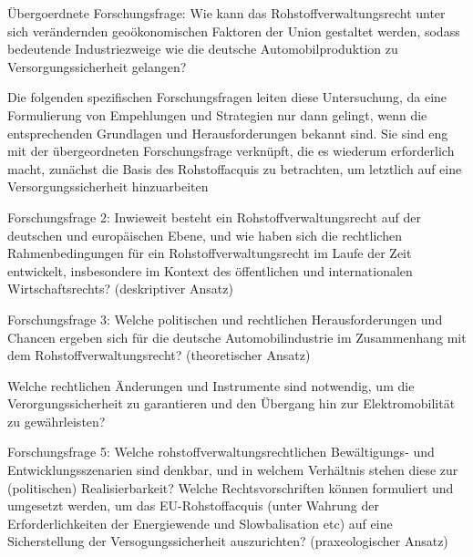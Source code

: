 \documentclass[12pt,a4paper,oneside]{book} %
\begin{document}
Übergoerdnete Forschungsfrage: Wie kann das Rohstoffverwaltungsrecht unter sich verändernden geoökonomischen Faktoren der Union gestaltet werden, sodass bedeutende Industriezweige wie die deutsche Automobilproduktion zu Versorgungssicherheit gelangen?

Die folgenden spezifischen Forschungsfragen leiten diese Untersuchung, da eine Formulierung von Empehlungen und Strategien nur dann gelingt, wenn die entsprechenden Grundlagen und Herausforderungen bekannt sind. Sie sind eng mit der übergeordneten Forschungsfrage verknüpft, die es wiederum erforderlich macht, zunächst die Basis des Rohstoffacquis zu betrachten, um letztlich auf eine Versorgungssicherheit hinzuarbeiten



Forschungsfrage 2: Inwieweit besteht ein Rohstoffverwaltungsrecht auf der deutschen und europäischen Ebene, und wie haben sich die rechtlichen Rahmenbedingungen für ein Rohstoffverwaltungsrecht im Laufe der Zeit entwickelt, insbesondere im Kontext des öffentlichen und internationalen Wirtschaftsrechts? (deskriptiver Ansatz)

Forschungsfrage 3: Welche politischen und rechtlichen Herausforderungen und Chancen ergeben sich für die deutsche Automobilindustrie im Zusammenhang mit dem Rohstoffverwaltungsrecht? (theoretischer Ansatz)


Welche rechtlichen Änderungen und Instrumente sind notwendig, um die Verorgungssicherheit zu garantieren und den Übergang hin zur Elektromobilität zu gewährleisten?

Forschungsfrage 5: Welche rohstoffverwaltungsrechtlichen Bewältigungs- und Entwicklungsszenarien sind denkbar, und in welchem Verhältnis stehen diese zur (politischen) Realisierbarkeit? Welche Rechtsvorschriften können formuliert und umgesetzt werden, um das EU-Rohstoffacquis (unter Wahrung der Erforderlichkeiten der Energiewende und Slowbalisation etc) auf eine Sicherstellung der Versogungssicherheit auszurichten? (praxeologischer Ansatz)
\end{document}
